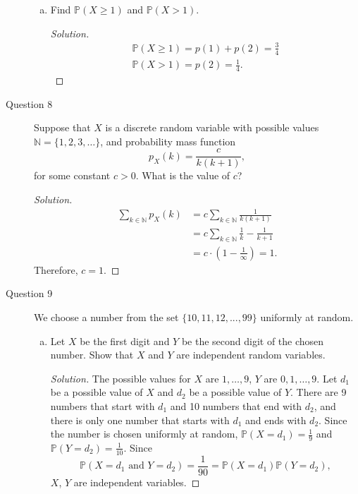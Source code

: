 \documentclass[addpoints, 11pt]{exam}
\newcommand*{\N}{\mathbb{N}}
\newcommand*{\prob}{\mathds{P}}
\begin{document}
\begin{description}
\begin{enumerate}[(a)]
        \item Find $\prob(X \geq 1)$ and $\prob(X > 1)$.

        \begin{proof}[Solution]
            \begin{gather}
                \prob(X \geq 1) = p(1) + p(2) = \frac{3}{4} \\
                \prob(X > 1) = p(2) = \frac{1}{4}.
            \end{gather}
        \end{proof}
    \end{enumerate}

    \newpage

    \item[Question 8] Suppose that $X$ is a discrete random variable with possible values $\N = \{1, 2, 3, \dots\}$, and probability mass function
    \[
        p_X(k) = \frac{c}{k(k+1)},
    \]
    for some constant $c > 0$. What is the value of $c$?

    \begin{proof}[Solution]
        \begin{align}
            \sum_{k \in \N} p_X(k) 
            &= c\sum_{k \in \N} \frac{1}{k(k+1)} \\
            &= c\sum_{k \in \N} \frac{1}{k} - \frac{1}{k + 1} \\
            &= c \cdot \left(1 - \frac{1}{\infty}\right) = 1.
        \end{align}
        Therefore, $c = 1$.
    \end{proof}

    \newpage

    \item[Question 9] We choose a number from the set $\{10, 11, 12, . . . , 99\}$ uniformly at random.

    \begin{enumerate}[(a)]
        \item Let $X$ be the first digit and $Y$ be the second digit of the chosen number. Show that $X$ and $Y$ are independent random variables.

        \begin{proof}[Solution]
            The possible values for $X$ are $1, \dots, 9$, $Y$ are $0, 1, \dots, 9$. Let $d_1$ be a possible value of $X$ and $d_2$ be a possible value of $Y$. There are 9 numbers that start with $d_1$ and 10 numbers that end with $d_2$, and there is only one number that starts with $d_1$ and ends with $d_2$. Since the number is chosen uniformly at random, $\prob(X = d_1) = \frac{1}{9}$ and $\prob(Y = d_2) = \frac{1}{10}$. Since \[
                \prob(X = d_1 \text{ and } Y = d_2) = \frac{1}{90} = \prob(X = d_1)\prob(Y = d_2),
            \]
            $X$, $Y$ are independent variables.
        \end{proof}


\end{enumerate}
\end{description}
\end{document}
